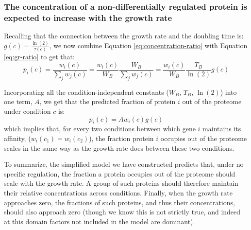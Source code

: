 \subsubsection{The concentration of a non-differentially regulated protein is expected to increase with the growth rate} 
Recalling that the connection between the growth rate and the doubling time is: $g(c)=\frac{\ln(2)}{\tau(c)}$, we now combine Equation \ref{eq:concentration-ratio} with Equation \ref{eq:gr-ratio} to get that:
\begin{equation}
  \label{eq:default-response}
  p_i(c)=\frac{w_i(c)}{\sum_jw_j(c)}=\frac{w_i(c)}{W_B}\frac{W_B}{\sum_jw_j(c)}=\frac{w_i(c)}{W_B}\frac{T_B}{\ln(2)}g(c)
\end{equation}

Incorporating all the condition-independent constants ($W_B$, $T_B$, $\ln(2)$) into one term, $A$, we get that the predicted fraction of protein $i$ out of the proteome under condition $c$ is:
\begin{equation}
  \label{eq:final-conc}
  p_i(c)=Aw_i(c)g(c)
\end{equation}
which implies that, for every two conditions between which gene $i$ maintains its affinity, ($w_i(c_1)=w_i(c_2)$), the fraction protein $i$ occupies out of the proteome scales in the same way as the growth rate does between these two conditions.


To summarize, the simplified model we have constructed predicts that, under no specific regulation, the fraction a protein occupies out of the proteome should scale with the growth rate.
A group of such proteins should therefore maintain their relative concentrations across conditions.
Finally, when the growth rate approaches zero, the fractions of such proteins, and thus their concentrations, should also approach zero (though we know this is not strictly true, and indeed at this domain factors not included in the model are dominant).